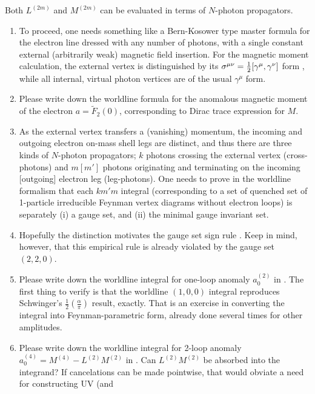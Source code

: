 Both $L^{(2m)}$ and $M^{(2m)}$ can be evaluated in terms of
$N$-photon propagators.

\begin{enumerate}
  \item
To proceed, one needs something like a Bern-Kosower type
master formula for the electron line dressed with any number of photons,
with a single constant external (arbitrarily weak) magnetic field insertion.
For the magnetic moment calculation, the external vertex is distinguished
by its
\(
\sigma^{\mu\nu}={1\over 2}[\gamma^{\mu},\gamma^{\nu}]
\)
form , while all internal, virtual photon vertices
are of the usual $\gamma^{\mu}$ form.
  \item
Please write down
the worldline formula for the anomalous magnetic moment
of the electron $a=\tilde{F}_2(0)$, corresponding to Dirac trace
expression  for $M$.
  \item
As the external vertex transfers a (vanishing) momentum, the
incoming and outgoing electron on-mass shell legs are distinct, and thus
there are three kinds of $N$-photon propagators; $k$ photons crossing the
external vertex (cross-photons) and $m [m']$ photons originating and
terminating on the incoming [outgoing] electron leg (leg-photons). One
needs to prove in the worldline formalism that each $km'm$
integral (corresponding to a set of quenched set of 1-particle
irreducible Feynman vertex diagrams without electron loops) is separately
(i) a gauge set, and
(ii) the minimal gauge invariant set.
  \item
Hopefully the distinction motivates the  gauge set sign rule
. Keep in mind, however, that this empirical rule is
already violated by the gauge set $(2,2,0)$.
  \item
Please write down
the worldline integral for one-loop anomaly $a_{0}^{(2)}$ in
.
The first thing to verify is that the worldline $(1,0,0)$ integral
reproduces Schwinger's $\frac{1}{2}\left(\frac{\alpha}{\pi}\right)$
result, exactly. That is an exercise in converting the
integral into Feynman-parametric form, already done several times for
other amplitudes.
  \item
Please write down the worldline integral for 2-loop anomaly
$a_{0}^{(4)}=M^{(4)}-L^{(2)}M^{(2)}$ in .
Can $L^{(2)}M^{(2)}$ be absorbed into the integrand? If cancelations can
be made pointwise, that would obviate a need for constructing UV  (and

\end{enumerate}
